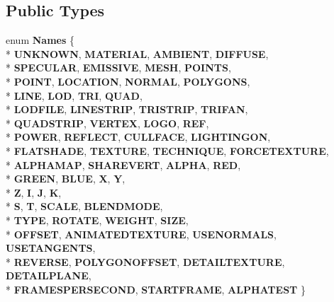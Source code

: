 \subsection*{Public Types}
\begin{DoxyCompactItemize}
\item 
enum {\bfseries Names} \{ \\*
{\bfseries U\+N\+K\+N\+O\+WN}, 
{\bfseries M\+A\+T\+E\+R\+I\+AL}, 
{\bfseries A\+M\+B\+I\+E\+NT}, 
{\bfseries D\+I\+F\+F\+U\+SE}, 
\\*
{\bfseries S\+P\+E\+C\+U\+L\+AR}, 
{\bfseries E\+M\+I\+S\+S\+I\+VE}, 
{\bfseries M\+E\+SH}, 
{\bfseries P\+O\+I\+N\+TS}, 
\\*
{\bfseries P\+O\+I\+NT}, 
{\bfseries L\+O\+C\+A\+T\+I\+ON}, 
{\bfseries N\+O\+R\+M\+AL}, 
{\bfseries P\+O\+L\+Y\+G\+O\+NS}, 
\\*
{\bfseries L\+I\+NE}, 
{\bfseries L\+OD}, 
{\bfseries T\+RI}, 
{\bfseries Q\+U\+AD}, 
\\*
{\bfseries L\+O\+D\+F\+I\+LE}, 
{\bfseries L\+I\+N\+E\+S\+T\+R\+IP}, 
{\bfseries T\+R\+I\+S\+T\+R\+IP}, 
{\bfseries T\+R\+I\+F\+AN}, 
\\*
{\bfseries Q\+U\+A\+D\+S\+T\+R\+IP}, 
{\bfseries V\+E\+R\+T\+EX}, 
{\bfseries L\+O\+GO}, 
{\bfseries R\+EF}, 
\\*
{\bfseries P\+O\+W\+ER}, 
{\bfseries R\+E\+F\+L\+E\+CT}, 
{\bfseries C\+U\+L\+L\+F\+A\+CE}, 
{\bfseries L\+I\+G\+H\+T\+I\+N\+G\+ON}, 
\\*
{\bfseries F\+L\+A\+T\+S\+H\+A\+DE}, 
{\bfseries T\+E\+X\+T\+U\+RE}, 
{\bfseries T\+E\+C\+H\+N\+I\+Q\+UE}, 
{\bfseries F\+O\+R\+C\+E\+T\+E\+X\+T\+U\+RE}, 
\\*
{\bfseries A\+L\+P\+H\+A\+M\+AP}, 
{\bfseries S\+H\+A\+R\+E\+V\+E\+RT}, 
{\bfseries A\+L\+P\+HA}, 
{\bfseries R\+ED}, 
\\*
{\bfseries G\+R\+E\+EN}, 
{\bfseries B\+L\+UE}, 
{\bfseries X}, 
{\bfseries Y}, 
\\*
{\bfseries Z}, 
{\bfseries I}, 
{\bfseries J}, 
{\bfseries K}, 
\\*
{\bfseries S}, 
{\bfseries T}, 
{\bfseries S\+C\+A\+LE}, 
{\bfseries B\+L\+E\+N\+D\+M\+O\+DE}, 
\\*
{\bfseries T\+Y\+PE}, 
{\bfseries R\+O\+T\+A\+TE}, 
{\bfseries W\+E\+I\+G\+HT}, 
{\bfseries S\+I\+ZE}, 
\\*
{\bfseries O\+F\+F\+S\+ET}, 
{\bfseries A\+N\+I\+M\+A\+T\+E\+D\+T\+E\+X\+T\+U\+RE}, 
{\bfseries U\+S\+E\+N\+O\+R\+M\+A\+LS}, 
{\bfseries U\+S\+E\+T\+A\+N\+G\+E\+N\+TS}, 
\\*
{\bfseries R\+E\+V\+E\+R\+SE}, 
{\bfseries P\+O\+L\+Y\+G\+O\+N\+O\+F\+F\+S\+ET}, 
{\bfseries D\+E\+T\+A\+I\+L\+T\+E\+X\+T\+U\+RE}, 
{\bfseries D\+E\+T\+A\+I\+L\+P\+L\+A\+NE}, 
\\*
{\bfseries F\+R\+A\+M\+E\+S\+P\+E\+R\+S\+E\+C\+O\+ND}, 
{\bfseries S\+T\+A\+R\+T\+F\+R\+A\+ME}, 
{\bfseries A\+L\+P\+H\+A\+T\+E\+ST}
 \}\hypertarget{structMeshXML_a41413567560258dbb6b0a67430b13716}{}\label{structMeshXML_a41413567560258dbb6b0a67430b13716}


\end{DoxyCompactItemize}
